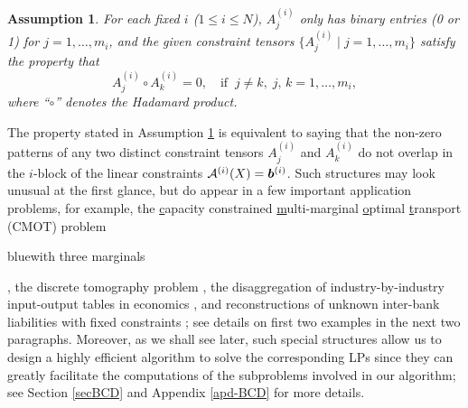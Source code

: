 \documentclass[10pt]{article}
\newcommand{\blue}[1]{\begin{color}{blue}#1\end{color}}
\newcommand{\cA}{{\cal A}}
\newtheorem{assumption}{Assumption}
\begin{document}
\begin{assumption}\label{assumption-nonoverlap}
For each fixed $i$ ($1\leq i\leq N$), $A_j^{(i)}$  only has binary entries (0 or 1) for $j=1,\dots,m_i$, and the given constraint tensors $\big \{ A_j^{(i)}\;|\; j = 1,\dots,m_i \big\}$ satisfy the property that
\begin{equation*}%
A_j^{(i)}\circ A_k^{(i)} = 0, \quad \text{if } ~j\neq k,\; j,\,k = 1,\dots,m_i,
\end{equation*}
where ``$\circ$'' denotes the Hadamard product. %
\end{assumption}

The property stated in Assumption \ref{assumption-nonoverlap} is equivalent to saying that the non-zero patterns of any two distinct constraint tensors $A^{(i)}_j$ and $A^{(i)}_k$ do not overlap in the $i$-block of the linear constraints $\cA^{(i)} (X) = \bm{b}^{(i)}$. Such structures may look unusual at the first glance, but do appear in a few important application problems, for example, the \underline{c}apacity constrained \underline{m}ulti-marginal \underline{o}ptimal \underline{t}ransport (CMOT) problem \blue{with three marginals}, the discrete tomography problem \cite{abraham2017tomographic,bergounioux2018variational,w2006tomography}, the disaggregation of industry-by-industry input-output tables in economics \cite{Holy-Safr}, and reconstructions of unknown inter-bank liabilities with fixed constraints \cite{Grandy-Veraart}; see details on first two examples in the next two paragraphs.
Moreover, as we shall see later, such special structures allow us to design a highly efficient algorithm to solve the corresponding LPs since they can greatly facilitate the computations of the subproblems involved in our algorithm; see Section \ref{secBCD} and Appendix \ref{apd-BCD} for more details.
\end{document}
